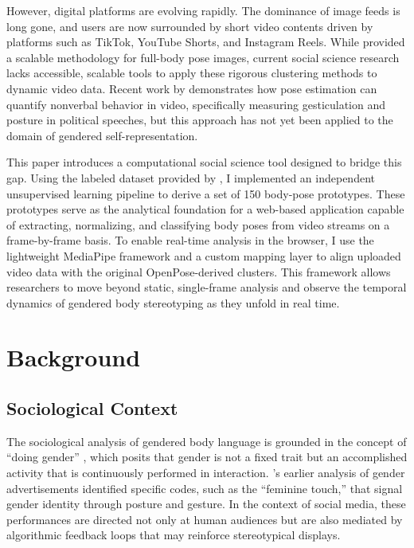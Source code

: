 \documentclass[12pt, a4paper]{article}
\begin{document}
However, digital platforms are evolving rapidly. The dominance of image feeds is long gone, and users are now surrounded by short video contents driven by platforms such as TikTok, YouTube Shorts, and Instagram Reels. While \citet{tsolak2025unveiling} provided a scalable methodology for full-body pose images, current social science research lacks accessible, scalable tools to apply these rigorous clustering methods to dynamic video data. Recent work by \citet{rittmann2024body} demonstrates how pose estimation can quantify nonverbal behavior in video, specifically measuring gesticulation and posture in political speeches, but this approach has not yet been applied to the domain of gendered self-representation.

This paper introduces a computational social science tool \citep{sahin2026unveiling} designed to bridge this gap. Using the labeled dataset provided by \citet{tsolak2025unveiling}, I implemented an independent unsupervised learning pipeline to derive a set of 150 body-pose prototypes. These prototypes serve as the analytical foundation for a web-based application capable of extracting, normalizing, and classifying body poses from video streams on a frame-by-frame basis. To enable real-time analysis in the browser, I use the lightweight MediaPipe \citep{mediapipe2019} framework and a custom mapping layer to align uploaded video data with the original OpenPose-derived clusters. This framework allows researchers to move beyond static, single-frame analysis and observe the temporal dynamics of gendered body stereotyping as they unfold in real time.


\section{Background}
\label{sec:background}

\subsection{Sociological Context}
\label{sec:sociology}

The sociological analysis of gendered body language is grounded in the concept of ``doing gender'' \citep{west1987doing}, which posits that gender is not a fixed trait but an accomplished activity that is continuously performed in interaction. \citet{goffman1979gender}'s earlier analysis of gender advertisements identified specific codes, such as the ``feminine touch,'' that signal gender identity through posture and gesture. In the context of social media, these performances are directed not only at human audiences but are also mediated by algorithmic feedback loops that may reinforce stereotypical displays.
\end{document}
